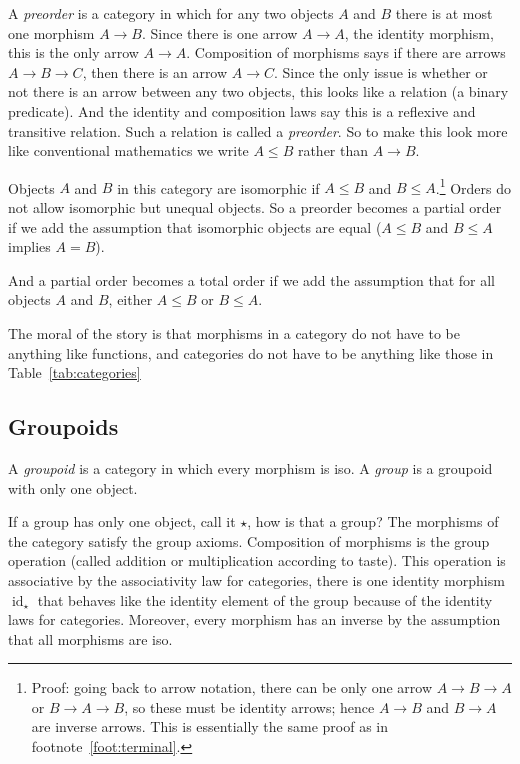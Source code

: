 \documentclass[11pt]{article}
\DeclareMathOperator{\idfun}{id}
\begin{document}
A \emph{preorder} is a category in which for any two objects $A$ and $B$
there is at most one morphism $A \to B$.  Since there is one arrow $A \to A$,
the identity morphism, this is the only arrow $A \to A$.
Composition of morphisms says if there are arrows $A \to B \to C$, then there
is an arrow $A \to C$.  Since the only issue is whether or not there is
an arrow between any two objects,
this looks like a relation (a binary predicate).
And the identity and composition laws say this is a reflexive and transitive
relation.  Such a relation is called a \emph{preorder}.
So to make this look more like conventional
mathematics we write $A \le B$ rather than $A \to B$.

Objects $A$ and $B$ in this category are isomorphic
if $A \le B$ and $B \le A$.\footnote{Proof: going back to arrow notation,
there can be only one arrow
$A \to B \to A$ or $B \to A \to B$, so these must be identity arrows;
hence $A \to B$ and $B \to A$ are inverse arrows.
This is essentially the same proof as in footnote~\ref{foot:terminal}.}
Orders do not allow isomorphic but unequal objects.
So a preorder becomes a partial order if
we add the assumption that isomorphic objects are equal
($A \le B$ and $B \le A$ implies $A = B$).

And a partial order becomes a total order if we add the assumption that
for all objects $A$ and $B$, either $A \le B$ or $B \le A$.

The moral of the story is that morphisms in a category do not have to
be anything like functions, and categories do not have to be anything
like those in Table~\ref{tab:categories}

\subsection{Groupoids}
\label{sec:groupoid}

A \emph{groupoid} is a category in which every morphism is iso.
A \emph{group} is a groupoid with only one object.

If a group has only one object, call it $\star$, how is that a group?
The morphisms of the category satisfy the group axioms.
Composition of morphisms is the group operation (called addition or
multiplication according to taste).  This operation is associative
by the associativity law for categories,
there is one identity morphism $\idfun_\star$
that behaves like the identity element of the group
because of the identity laws for categories.
Moreover, every morphism has an inverse by the assumption that all
morphisms are iso.
\end{document}
